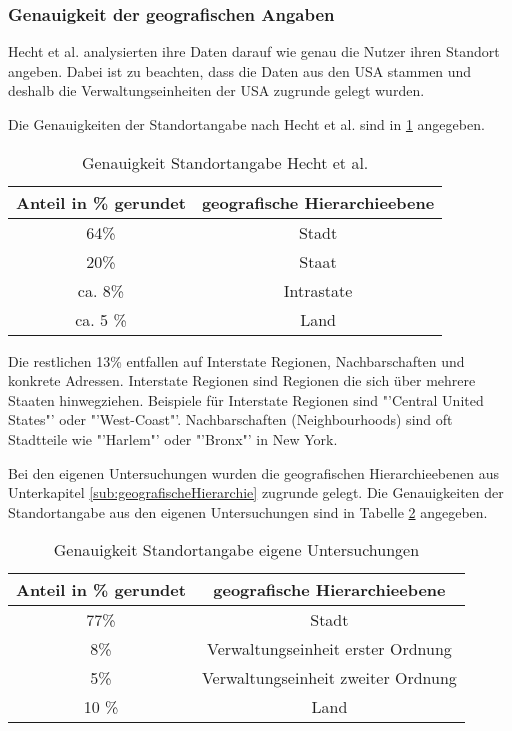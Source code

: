 				
			\subsubsection{Genauigkeit der geografischen Angaben}
				
				Hecht et al. analysierten ihre Daten darauf wie genau die Nutzer ihren Standort angeben.
				Dabei ist zu beachten, dass die Daten aus den USA stammen und deshalb die Verwaltungseinheiten der USA zugrunde gelegt wurden.
				
				Die Genauigkeiten der Standortangabe nach Hecht et al. sind in \ref{tab:genauigkeitenHecht} angegeben. 

				\begin{table}[htpb]
				\caption{Genauigkeit Standortangabe Hecht et al.} 
				\centering
				\begin{tabular}{|c||c|}
					\hline
					Anteil in \% gerundet & geografische Hierarchieebene \\
					\hline\hline
					64\% & Stadt \\
					\hline
					20\% & Staat \\
					\hline
					ca. 8\% & Intrastate \\
					\hline
					ca. 5 \% & Land \\
					\hline
				\end{tabular}
				\label{tab:genauigkeitenHecht} 
				\end{table} 

				Die restlichen 13\% entfallen auf Interstate Regionen, Nachbarschaften und konkrete Adressen. 
				Interstate Regionen sind Regionen die sich über mehrere Staaten hinwegziehen. 
				Beispiele für Interstate Regionen sind "'Central United States"' oder "'West-Coast"'.
				Nachbarschaften (Neighbourhoods) sind oft Stadtteile wie "'Harlem"' oder "'Bronx"' in New York.

				Bei den eigenen Untersuchungen wurden die geografischen Hierarchieebenen aus Unterkapitel \ref{sub:geografischeHierarchie} zugrunde gelegt.
				Die Genauigkeiten der Standortangabe aus den eigenen Untersuchungen sind in Tabelle \ref{tab:genauigkeitenEigene} angegeben.

				\begin{table}[htpb]
				\caption{Genauigkeit Standortangabe eigene Untersuchungen} 
				\centering
				\begin{tabular}{|c||c|}
					\hline
					Anteil in \% gerundet & geografische Hierarchieebene \\
					\hline\hline
					77\% & Stadt \\
					\hline
					8\% & Verwaltungseinheit erster Ordnung  \\
					\hline
					5\% & Verwaltungseinheit zweiter Ordnung  \\
					\hline
					10 \% & Land \\
					\hline
				\end{tabular}
				\label{tab:genauigkeitenEigene} 
				\end{table} 

